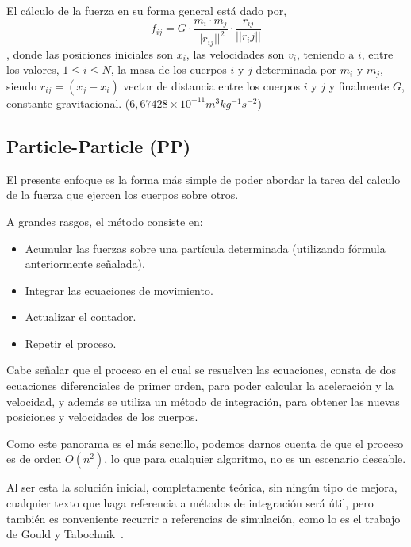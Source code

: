 


El cálculo de la fuerza en su forma general está dado por,
$$f_{ij} =G \cdot \frac{m_i \cdot m_j}{||r_{ij}||^{2}} \cdot \frac{r_{ij}}{||r_ij||}$$,
donde las posiciones iniciales son $x_i$,
las velocidades son $v_i$,
teniendo a $i$, entre los valores, $1 \leq i \leq N$,
la masa de los cuerpos $i$ y $j$ determinada por $m_i$ y $m_j$,
siendo $r_{ij} = (x_j - x_i )$ vector de distancia entre los cuerpos $i$ y $j$
y finalmente $G$, constante gravitacional. ($6,67428 \times 10^{-11} m^{3} kg^{-1} s^{-2}$)


\subsection{Particle-Particle (PP)}

El presente enfoque es la forma más simple de poder abordar
la tarea del calculo de la fuerza que ejercen los cuerpos sobre otros.

A grandes rasgos, el método consiste en:
\begin{itemize}
	\item Acumular las fuerzas sobre una partícula determinada (utilizando fórmula anteriormente señalada).
	\item Integrar las ecuaciones de movimiento.
	\item Actualizar el contador.
	\item Repetir el proceso.
\end{itemize}

Cabe señalar que el proceso en el cual se resuelven las ecuaciones,
consta de dos ecuaciones diferenciales de primer orden,
para poder calcular la aceleración y la velocidad,
y además se utiliza un método de integración, para obtener
las nuevas posiciones y velocidades de los cuerpos.

Como este panorama es el más sencillo,
podemos darnos cuenta de que el proceso es de orden $O(n^{2})$,
lo que para cualquier algoritmo, no es un escenario
deseable.

Al ser esta la solución inicial, completamente teórica,
sin ningún tipo de mejora, cualquier texto que haga
referencia a métodos de integración será útil,
pero también es conveniente recurrir a referencias
de simulación, como lo es el trabajo de Gould y Tabochnik~.

